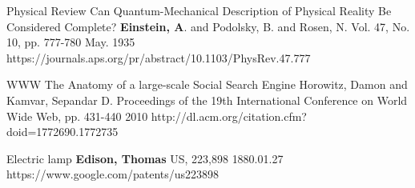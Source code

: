 


\begin{cventries}

  \cvpublicationentry
    {Physical Review} %
    {Can Quantum-Mechanical Description of Physical Reality Be Considered Complete?} %
    {\textbf{Einstein, A}. and Podolsky, B. and Rosen, N.} %
    {Vol. 47, No. 10, pp. 777-780}
    {May. 1935} %
    {https://journals.aps.org/pr/abstract/10.1103/PhysRev.47.777}
\end{cventries}

\begin{cventries}

  \cvpublicationentry
    {WWW} %
    {The Anatomy of a large-scale Social Search Engine} %
    {Horowitz, Damon and Kamvar, Sepandar D.} %
    {Proceedings of the 19th International Conference on World Wide Web, pp. 431-440}
    {2010} %
    {http://dl.acm.org/citation.cfm?doid=1772690.1772735}
\end{cventries}


\begin{cventries}
  \cvpatententry
    {Electric lamp} %
    {\textbf{Edison, Thomas}} %
    {US, 223,898} %
    {1880.01.27} %
    {https://www.google.com/patents/us223898}
\end{cventries}

